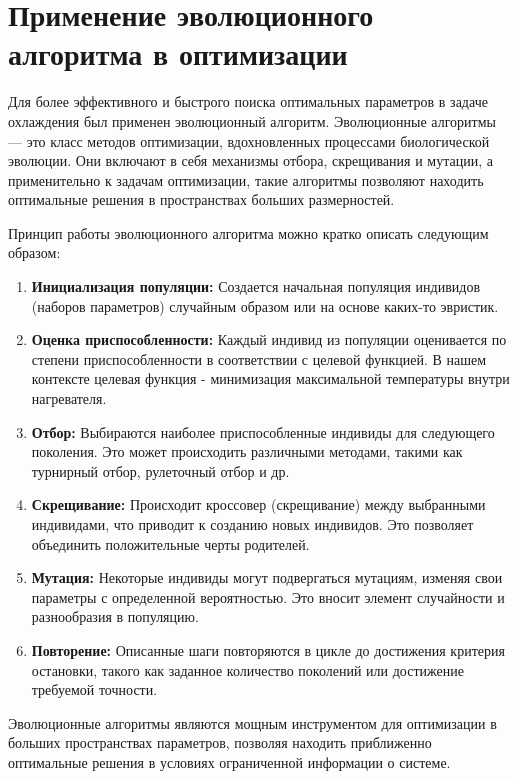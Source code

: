 \documentclass[a4paper,12pt]{article}
\theoremstyle{plain} %
\theoremstyle{definition} %
\theoremstyle{remark} %
\begin{document}
\section{Применение эволюционного алгоритма в оптимизации}

Для более эффективного и быстрого поиска оптимальных параметров в задаче охлаждения был применен эволюционный алгоритм. Эволюционные алгоритмы — это класс методов оптимизации, вдохновленных процессами биологической эволюции. Они включают в себя механизмы отбора, скрещивания и мутации, а применительно к задачам оптимизации, такие алгоритмы позволяют находить оптимальные решения в пространствах больших размерностей.

Принцип работы эволюционного алгоритма можно кратко описать следующим образом:

\begin{enumerate}
    \item \textbf{Инициализация популяции:} Создается начальная популяция индивидов (наборов параметров) случайным образом или на основе каких-то эвристик.

    \item \textbf{Оценка приспособленности:} Каждый индивид из популяции оценивается по степени приспособленности в соответствии с целевой функцией. В нашем контексте целевая функция - минимизация максимальной температуры внутри нагревателя.

    \item \textbf{Отбор:} Выбираются наиболее приспособленные индивиды для следующего поколения. Это может происходить различными методами, такими как турнирный отбор, рулеточный отбор и др.

    \item \textbf{Скрещивание:} Происходит кроссовер (скрещивание) между выбранными индивидами, что приводит к созданию новых индивидов. Это позволяет объединить положительные черты родителей.

    \item \textbf{Мутация:} Некоторые индивиды могут подвергаться мутациям, изменяя свои параметры с определенной вероятностью. Это вносит элемент случайности и разнообразия в популяцию.

    \item \textbf{Повторение:} Описанные шаги повторяются в цикле до достижения критерия остановки, такого как заданное количество поколений или достижение требуемой точности.
\end{enumerate}

Эволюционные алгоритмы являются мощным инструментом для оптимизации в больших пространствах параметров, позволяя находить приближенно оптимальные решения в условиях ограниченной информации о системе.
\end{document}

